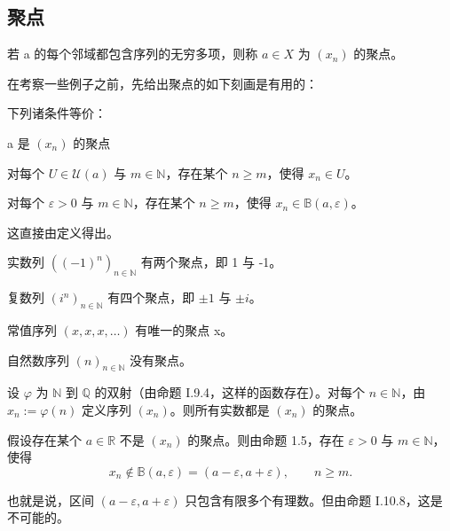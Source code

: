 \subsection*{聚点}

若 a 的每个邻域都包含序列的无穷多项，则称  $ a \in X $ 为  $ (x_n) $ 的聚点。

在考察一些例子之前，先给出聚点的如下刻画是有用的：

\begin{proposition}

下列诸条件等价：

\begin{subitems}
\item

a 是  $ (x_{n}) $ 的聚点

\item

对每个  $ U \in \mathcal{U}(a) $ 与  $ m \in \mathbb{N} $，存在某个  $ n \geq m $，使得  $ x_n \in U $。

\item

对每个  $ \varepsilon > 0 $ 与  $ m \in \mathbb{N} $，存在某个  $ n \geq m $，使得  $ x_n \in \mathbb{B}(a, \varepsilon) $。

\proofhead
这直接由定义得出。
\end{subitems}

\end{proposition}

\begin{example}

\begin{items}
\item

实数列  $ ((-1)^n)_{n \in \mathbb{N}} $ 有两个聚点，即 1 与 -1。

\item

复数列  $ (i^n)_{n \in \mathbb{N}} $ 有四个聚点，即  $ \pm 1 $ 与  $ \pm i $。

\item

常值序列  $ (x,x,x,\ldots) $ 有唯一的聚点 x。

\item

自然数序列  $ (n)_{n \in \mathbb{N}} $ 没有聚点。

\item

设  $ \varphi $ 为  $ \mathbb{N} $ 到  $ \mathbb{Q} $ 的双射（由命题 I.9.4，这样的函数存在）。对每个  $ n \in \mathbb{N} $，由  $ x_n := \varphi(n) $ 定义序列  $ (x_n) $。则所有实数都是  $ (x_n) $ 的聚点。

\proofhead
假设存在某个  $ a \in \mathbb{R} $ 不是  $ (x_n) $ 的聚点。则由命题 1.5，存在  $ \varepsilon > 0 $ 与  $ m \in \mathbb{N} $，使得
\[
x_{n}\notin\mathbb{B}(a,\varepsilon)=(a-\varepsilon,a+\varepsilon),\qquad n\geq m.
\]

也就是说，区间  $ (a - \varepsilon, a + \varepsilon) $ 只包含有限多个有理数。但由命题 I.10.8，这是不可能的。

\end{items}

\end{example}

